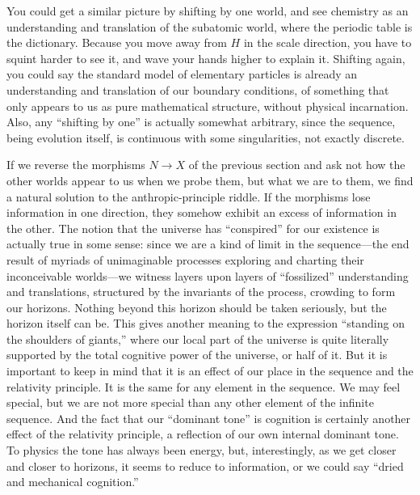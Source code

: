 \documentclass[11pt]{article}
\begin{document}
You could get a similar picture by shifting by one world, and see chemistry as
an understanding and translation of the subatomic world, where the periodic
table is the dictionary. Because you move away from \(H\) in the scale
direction, you have to squint harder to see it, and wave your hands higher to
explain it. Shifting again, you could say the standard model of elementary
particles is already an understanding and translation of our boundary
conditions, of something that only appears to us as pure mathematical
structure, without physical incarnation. Also, any ``shifting by one'' is
actually somewhat arbitrary, since the sequence, being evolution itself, is
continuous with some singularities, not exactly discrete.

If we reverse the morphisms \(N \to X\) of the previous section and ask not how
the other worlds appear to us when we probe them, but what we are to them, we
find a natural solution to the anthropic-principle riddle. If the morphisms
lose information in one direction, they somehow exhibit an excess of
information in the other. The notion that the universe has ``conspired'' for
our existence is actually true in some sense: since we are a kind of limit in
the sequence---the end result of myriads of unimaginable processes exploring
and charting their inconceivable worlds---we witness layers upon layers of
``fossilized'' understanding and translations, structured by the invariants of
the process, crowding to form our horizons. Nothing beyond this horizon should
be taken seriously, but the horizon itself can be. This gives another meaning
to the expression ``standing on the shoulders of giants,'' where our local part
of the universe is quite literally supported by the total cognitive power of
the universe, or half of it. But it is important to keep in mind that it is an
effect of our place in the sequence and the relativity principle. It is the
same for any element in the sequence. We may feel special, but we are not more
special than any other element of the infinite sequence. And the fact that our
``dominant tone'' is cognition is certainly another effect of the relativity
principle, a reflection of our own internal dominant tone. To physics the tone
has always been energy, but, interestingly, as we get closer and closer to
horizons, it seems to reduce to information, or we could say ``dried and
mechanical cognition.''
\end{document}
